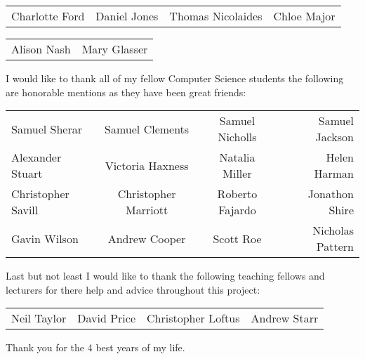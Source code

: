 \begin{center}
\begin{tabular}{ l c c r }
Charlotte Ford & Daniel Jones & Thomas Nicolaides & Chloe Major\\
\end{tabular}
\end{center}

\begin{center}
\begin{tabular}{ l r }
Alison Nash & Mary Glasser\\
\end{tabular}
\end{center}

\noindent
I would like to thank all of my fellow Computer Science students the following are honorable mentions as they have been great friends: 

\begin{center}
\begin{tabular}{ l c c r }
Samuel Sherar & Samuel Clements & Samuel Nicholls & Samuel Jackson \\
Alexander Stuart & Victoria Haxness & Natalia Miller & Helen Harman \\
Christopher Savill & Christopher Marriott & Roberto Fajardo & Jonathon Shire \\
Gavin Wilson & Andrew Cooper & Scott Roe & Nicholas Pattern \\ 
\end{tabular}
\end{center}

\noindent
Last but not least I would like to thank the following teaching fellows and lecturers for there help and advice throughout this project:
\begin{center}
\begin{tabular}{ l c c r }
Neil Taylor & David Price & Christopher Loftus & Andrew Starr\\
\end{tabular}
\end{center}

\noindent
Thank you for the 4 best years of my life.